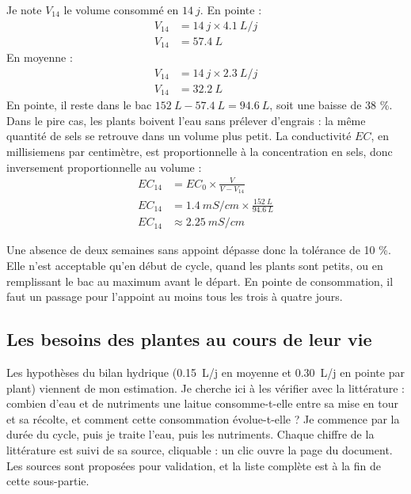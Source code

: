 \begin{demonstration}
Je note $V_{14}$ le volume consommé en $\qty{14}{j}$. En pointe :
\begin{align*}
V_{14} &= \qty{14}{j}\times\qty{4,1}{L/j}\\
V_{14} &= \qty{57,4}{L}
\end{align*}
En moyenne :
\begin{align*}
V_{14} &= \qty{14}{j}\times\qty{2,3}{L/j}\\
V_{14} &= \qty{32,2}{L}
\end{align*}
En pointe, il reste dans le bac $\qty{152}{L} - \qty{57,4}{L} = \qty{94,6}{L}$, soit une baisse de 38 \%. Dans le pire cas, les plants boivent l'eau sans prélever d'engrais : la même quantité de sels se retrouve dans un volume plus petit. La conductivité $EC$, en millisiemens par centimètre, est proportionnelle à la concentration en sels, donc inversement proportionnelle au volume :
\begin{align*}
EC_{14} &= EC_0\times\frac{V}{V - V_{14}}\\
EC_{14} &= \qty{1,4}{mS/cm}\times\frac{\qty{152}{L}}{\qty{94,6}{L}}\\
EC_{14} &\approx \qty{2,25}{mS/cm}
\end{align*}
\end{demonstration}

Une absence de deux semaines sans appoint dépasse donc la tolérance de 10 \%. Elle n'est acceptable qu'en début de cycle, quand les plants sont petits, ou en remplissant le bac au maximum avant le départ. En pointe de consommation, il faut un passage pour l'appoint au moins tous les trois à quatre jours.

\newcommand{\srcl}[2]{\href{#2}{\textcolor{blue}{\underline{#1}}}}

\subsection{Les besoins des plantes au cours de leur vie}

Les hypothèses du bilan hydrique (\qty{0,15}{L/j} en moyenne et \qty{0,30}{L/j} en pointe par plant) viennent de mon estimation. Je cherche ici à les vérifier avec la littérature : combien d'eau et de nutriments une laitue consomme-t-elle entre sa mise en tour et sa récolte, et comment cette consommation évolue-t-elle ? Je commence par la durée du cycle, puis je traite l'eau, puis les nutriments. Chaque chiffre de la littérature est suivi de sa source, cliquable : un clic ouvre la page du document. Les sources sont proposées pour validation, et la liste complète est à la fin de cette sous-partie.

